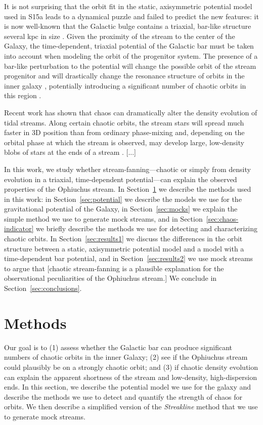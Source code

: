 \documentclass[letterpaper,12pt,preprint]{aastex}
\begin{document}
It is not surprising that the orbit fit in the static, axisymmetric potential model used in S15a leads to a dynamical puzzle and failed to predict the new features: it is now well-known that the Galactic bulge contains a triaxial, bar-like structure several kpc in size \citep[e.g.,][]{blitzXX, wegg13, MANY}. Given the proximity of the stream to the center of the Galaxy, the time-dependent, triaxial potential of the Galactic bar must be taken into account when modeling the orbit of the progenitor system. The presence of a bar-like perturbation to the potential will change the possible orbit of the stream progenitor and will drastically change the resonance structure of orbits in the inner galaxy \citep{athanassoula, portail15b MANY}, potentially introducing a significant number of chaotic orbits in this region \citep{weinberg15}.

Recent work has shown that chaos can dramatically alter the density evolution of tidal streams. Along certain chaotic orbits, the stream stars will spread much faster in 3D position than from ordinary phase-mixing and, depending on the orbital phase at which the stream is observed, may develop large, low-density blobs of stars at the ends of a stream \citep{apw15-chaos}. [...]

In this work, we study whether stream-fanning---chaotic or simply from density evolution in a triaxial, time-dependent potential---can explain the observed properties of the Ophiuchus stream. In Section~\ref{sec:method} we describe the methods used in this work: in Section~\ref{sec:potential} we describe the models we use for the gravitational potential of the Galaxy, in Section~\ref{sec:mocks} we explain the simple method we use to generate mock streams, and in Section~\ref{sec:chaos-indicator} we briefly describe the methods we use for detecting and characterizing chaotic orbits. In Section~\ref{sec:results1} we discuss the differences in the orbit structure between a static, axisymmetric potential model and a model with a time-dependent bar potential, and in Section~\ref{sec:results2} we use mock streams to argue that [chaotic stream-fanning is a plausible explanation for the observational peculiarities of the Ophiuchus stream.] We conclude in Section~\ref{sec:conclusions}.

\section{Methods}\label{sec:method}

Our goal is to (1) assess whether the Galactic bar can produce significant numbers of chaotic orbits in the inner Galaxy; (2) see if the Ophiuchus stream could plausibly be on a strongly chaotic orbit; and (3) if chaotic density evolution can explain the apparent shortness of the stream and low-density, high-dispersion ends. In this section, we describe the potential model we use for the galaxy and describe the methods we use to detect and quantify the strength of chaos for orbits. We then describe a simplified version of the \emph{Streakline} method \citep{kuepper12} that we use to generate mock streams.
\end{document}
